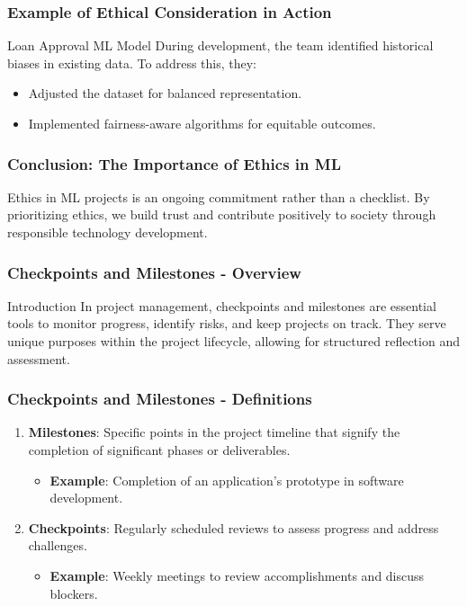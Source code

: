 \documentclass[aspectratio=169]{beamer}
\begin{document}
\begin{frame}[fragile]
    \frametitle{Example of Ethical Consideration in Action}
    \begin{block}{Loan Approval ML Model}
        During development, the team identified historical biases in existing data. To address this, they:
        \begin{itemize}
            \item Adjusted the dataset for balanced representation.
            \item Implemented fairness-aware algorithms for equitable outcomes.
        \end{itemize}
    \end{block}
\end{frame}

\begin{frame}[fragile]
    \frametitle{Conclusion: The Importance of Ethics in ML}
    Ethics in ML projects is an ongoing commitment rather than a checklist. By prioritizing ethics, we build trust and contribute positively to society through responsible technology development.
\end{frame}

\begin{frame}[fragile]
    \frametitle{Checkpoints and Milestones - Overview}
    \begin{block}{Introduction}
        In project management, checkpoints and milestones are essential tools to monitor progress, identify risks, and keep projects on track. They serve unique purposes within the project lifecycle, allowing for structured reflection and assessment.
    \end{block}
\end{frame}

\begin{frame}[fragile]
    \frametitle{Checkpoints and Milestones - Definitions}
    \begin{enumerate}
        \item \textbf{Milestones}: Specific points in the project timeline that signify the completion of significant phases or deliverables. 
        \begin{itemize}
            \item \textbf{Example}: Completion of an application’s prototype in software development.
        \end{itemize}
        
        \item \textbf{Checkpoints}: Regularly scheduled reviews to assess progress and address challenges.
        \begin{itemize}
            \item \textbf{Example}: Weekly meetings to review accomplishments and discuss blockers.
        \end{itemize}
    \end{enumerate}
\end{frame}
\end{document}
